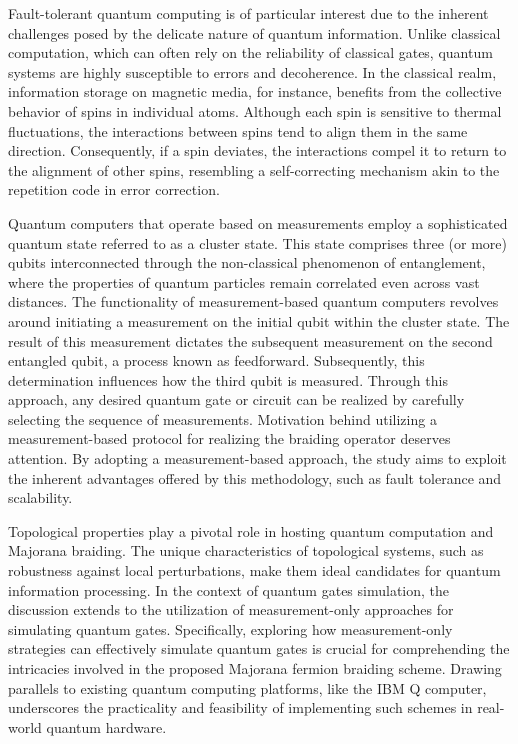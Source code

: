 \documentclass{article}
\begin{document}
Fault-tolerant quantum computing is of particular interest due to the inherent challenges posed by the delicate nature of quantum information. Unlike classical computation, which can often rely on the reliability of classical gates, quantum systems are highly susceptible to errors and decoherence. In the classical realm, information storage on magnetic media, for instance, benefits from the collective behavior of spins in individual atoms. Although each spin is sensitive to thermal fluctuations, the interactions between spins tend to align them in the same direction. Consequently, if a spin deviates, the interactions compel it to return to the alignment of other spins, resembling a self-correcting mechanism akin to the repetition code in error correction.\cite{Kitaev_2003}

Quantum computers that operate based on measurements employ a sophisticated quantum state referred to as a cluster state. This state comprises three (or more) qubits interconnected through the non-classical phenomenon of entanglement, where the properties of quantum particles remain correlated even across vast distances. The functionality of measurement-based quantum computers revolves around initiating a measurement on the initial qubit within the cluster state. The result of this measurement dictates the subsequent measurement on the second entangled qubit, a process known as feedforward. Subsequently, this determination influences how the third qubit is measured. Through this approach, any desired quantum gate or circuit can be realized by carefully selecting the sequence of measurements.\cite{quantum_comp} Motivation behind utilizing a measurement-based protocol for realizing the braiding operator deserves attention. By adopting a measurement-based approach, the study aims to exploit the inherent advantages offered by this methodology, such as fault tolerance and scalability.

Topological properties play a pivotal role in hosting quantum computation and Majorana braiding. The unique characteristics of topological systems, such as robustness against local perturbations, make them ideal candidates for quantum information processing. In the context of quantum gates simulation, the discussion extends to the utilization of measurement-only approaches for simulating quantum gates. Specifically, exploring how measurement-only strategies can effectively simulate quantum gates is crucial for comprehending the intricacies involved in the proposed Majorana fermion braiding scheme. Drawing parallels to existing quantum computing platforms, like the IBM Q computer, underscores the practicality and feasibility of implementing such schemes in real-world quantum hardware.
\end{document}
